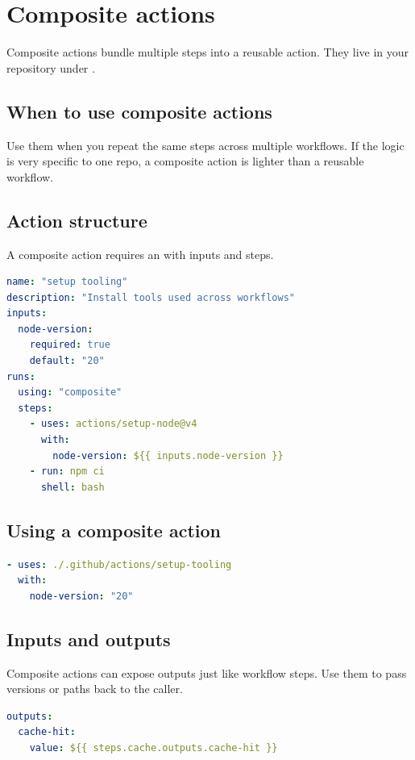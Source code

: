 \chapter{Composite actions}

Composite actions bundle multiple steps into a reusable action.
They live in your repository under .

\section{When to use composite actions}
Use them when you repeat the same steps across multiple workflows.
If the logic is very specific to one repo, a composite action is lighter than a reusable workflow.

\section{Action structure}
A composite action requires an  with inputs and steps.

\begin{lstlisting}[language=YAML]
name: "setup tooling"
description: "Install tools used across workflows"
inputs:
  node-version:
    required: true
    default: "20"
runs:
  using: "composite"
  steps:
    - uses: actions/setup-node@v4
      with:
        node-version: ${{ inputs.node-version }}
    - run: npm ci
      shell: bash
\end{lstlisting}

\section{Using a composite action}
\begin{lstlisting}[language=YAML]
- uses: ./.github/actions/setup-tooling
  with:
    node-version: "20"
\end{lstlisting}

\section{Inputs and outputs}
Composite actions can expose outputs just like workflow steps.
Use them to pass versions or paths back to the caller.

\begin{lstlisting}[language=YAML]
outputs:
  cache-hit:
    value: ${{ steps.cache.outputs.cache-hit }}
\end{lstlisting}

